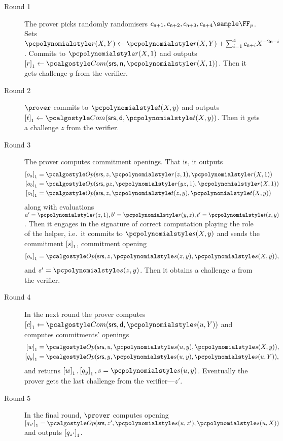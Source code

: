 \documentclass[runningheads,11pt]{llncs}
\begin{document}
\begin{description}
\item[Round 1] The prover picks randomly randomisers
  $c_{\multconstr + 1}, c_{\multconstr + 2}, c_{\multconstr + 3}, c_{\multconstr
    + 4} \sample \FF_p$. Sets
  $\pr(X, Y) \gets \pr(X, Y) + \sum_{i = 1}^4 c_{\multconstr + i} X^{- 2
    \multconstr - i}$. Commits to $\pr(X, 1)$ and outputs
  $\gone{r} \gets \com(\srs, \multconstr, \pr(X, 1))$.  Then it gets challenge $y$ from
  the verifier.
\item[Round 2] $\prover$ commits to $\pt(X, y)$ and outputs
  $\gone{t} \gets \com(\srs, \dconst, \pt(X, y))$. Then it gets a challenge $z$ from
  the verifier.
\item[Round 3] The prover computes commitment openings. That is, it outputs
  \begin{align*}
    \gone{o_a} & = \open(\srs, z, \pr(z, 1), \pr(X, 1)) \\
    \gone{o_b} & = \open(\srs, yz, \pr(yz, 1), \pr(X, 1)) \\
    \gone{o_t} & = \open(\srs, z, \pt(z, y), \pt(X, y)) 
  \end{align*}
  along with evaluations $a' = \pr(z, 1), b' = \pr(y, z), t' = \pt(z, y)$.  Then it
  engages in the signature of correct computation playing the role of the
  helper, i.e.~it commits to $\p{s}(X, y)$ and sends the commitment $\left[s\right]_{1}$, commitment opening
  \begin{align*}
    \gone{o_s} & = \open(\srs, z, \p{s}(z, y), \p{s}(X, y)), \\
  \end{align*} and $s'=\p{s}(z, y)$. 
%
  Then
  it obtains a challenge $u$ from the verifier.
\item[Round 4] In the next round the prover computes
  $\gone{c} \gets \com(\srs, \dconst, \p{s}(u, Y))$ and
  computes commitments' openings
  \begin{align*}
    \gone{w} & = \open(\srs, u, \p{s}(u, y), \p{s}(X, y)), \\
    \gone{q_y} & = \open(\srs, y,\p{s}(u, y), \p{s}(u, Y)),
  \end{align*}
  and returns $\gone{w}, \gone{q_y}, s = \p{s}(u, y)$. Eventually the prover gets the last challenge
  from the verifier---$z'$.
\item[Round 5] In the final round, $\prover$ computes opening
  $\gone{q_{z'}} = \open(\srs, z', \p{s}(u, z'), \p{s}(u, X))$ and outputs $\left[q_{z'}\right]_{1}$.
\end{description}
\end{document}
